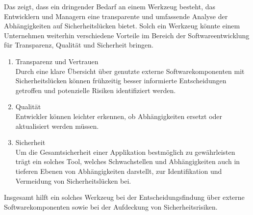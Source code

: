     Das zeigt, dass ein dringender Bedarf an einem Werkzeug besteht, das Entwicklern und Managern eine transparente und umfassende Analyse der Abhängigkeiten auf Sicherheitslücken bietet.
    Solch ein Werkzeug könnte einem Unternehmen weiterhin verschiedene Vorteile im Bereich der Softwareentwicklung für Transparenz, Qualität und Sicherheit bringen.
    \begin{enumerate}
        \item Transparenz und Vertrauen\\
            Durch eine klare Übersicht über genutzte externe Softwarekomponenten mit Sicherheitslücken können frühzeitig besser informierte Entscheidungen getroffen und potenzielle Risiken identifiziert werden.
        \item Qualität\\
            Entwickler können leichter erkennen, ob Abhängigkeiten ersetzt oder aktualisiert werden müssen.
        \item Sicherheit\\
            Um die Gesamtsicherheit einer Applikation bestmöglich zu gewährleisten trägt ein solches Tool, welches Schwachstellen und Abhängigkeiten auch in tieferen Ebenen von Abhängigkeiten darstellt, zur Identifikation und Vermeidung von Sicherheitslücken bei. 
    \end{enumerate}
    Insgesamt hilft ein solches Werkzeug bei der Entscheidungsfindung über externe Softwarekomponenten sowie bei der Aufdeckung von Sicherheitsrisiken.
